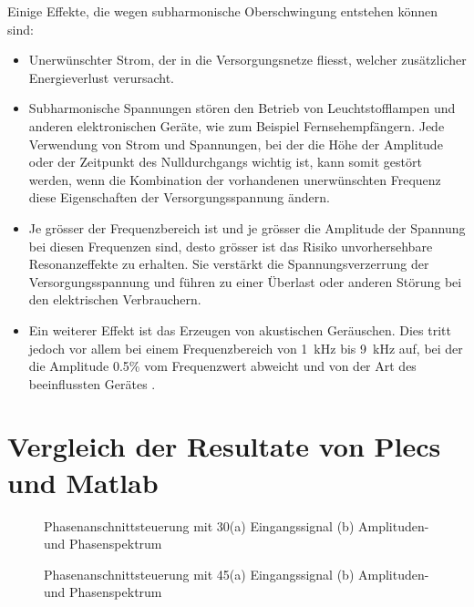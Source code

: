 \begin{appendix}
Einige Effekte, die wegen subharmonische Oberschwingung entstehen können sind:
\begin{itemize}
	\item Unerwünschter Strom, der in die Versorgungsnetze fliesst, welcher zusätzlicher Energieverlust verursacht.
	\item Subharmonische Spannungen stören den Betrieb von Leuchtstofflampen und anderen elektronischen Geräte, wie zum Beispiel Fernsehempfängern. Jede Verwendung von Strom und Spannungen, bei der die Höhe der Amplitude oder der Zeitpunkt des Nulldurchgangs wichtig ist, kann somit gestört werden, wenn die Kombination der vorhandenen unerwünschten Frequenz diese Eigenschaften der Versorgungsspannung ändern.
	\item Je grösser der Frequenzbereich ist und je grösser die Amplitude der Spannung bei diesen Frequenzen sind, desto grösser ist das Risiko unvorhersehbare Resonanzeffekte zu erhalten. Sie verstärkt die Spannungsverzerrung der Versorgungsspannung und führen zu einer Überlast oder anderen Störung bei den elektrischen Verbrauchern.
	\item Ein weiterer Effekt ist das Erzeugen von akustischen Geräuschen. Dies tritt jedoch vor allem bei einem Frequenzbereich von \SI{1}{kHz} bis \SI{9}{kHz} auf, bei der die Amplitude 0.5\% vom Frequenzwert abweicht und von der Art des beeinflussten Gerätes \cite{SpannungsNorm}.
\end{itemize}

\newpage
\section{Vergleich der Resultate von Plecs und Matlab}\label{sec:Vergleich_der_Resultate}

\begin{figure}[ht!]
	\centering
	\qquad
	\caption{Phasenanschnittsteuerung mit 30\textdegree (a) Eingangssignal (b) Amplituden- und Phasenspektrum}
	\label{fig:Phasenanschnittsteuerung_mit_30}
\end{figure}

\begin{figure}[ht!]
	\centering
	\qquad
	\caption{Phasenanschnittsteuerung mit 45\textdegree (a) Eingangssignal (b) Amplituden- und Phasenspektrum}
	\label{fig:Phasenanschnittsteuerung_mit_45}
\end{figure}


\end{appendix}
